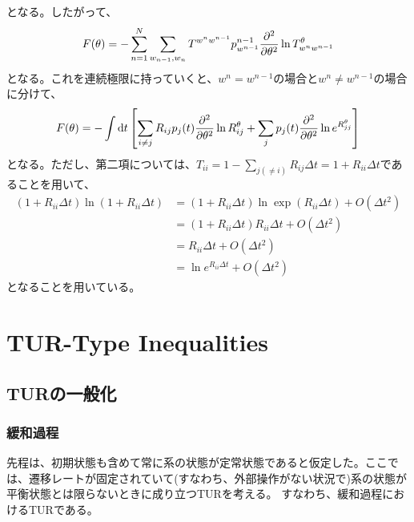 \documentclass[a4paper,11pt]{jsarticle}
\numberwithin{equation}{section}
\begin{document}
となる。したがって、
\begin{align}
    F(\theta) = -\sum_{n=1}^N \sum_{w_{n-1}, w_n} T^{w^n w^{n-1}} p^{n-1}_{w^{n-1}} \pdv[2]{\theta} \ln T^\theta_{w^n w^{n-1}}
\end{align}
となる。これを連続極限に持っていくと、$w^n = w^{n-1}$の場合と$w^n \neq w^{n-1}$の場合に分けて、
\begin{align}
    F(\theta) = -\int \dd{t} \qty[\sum_{i \neq j} R_{ij} p_j(t) \pdv[2]{\theta} \ln R_{ij}^\theta + \sum_j p_j(t) \pdv[2]{\theta} \ln e^{R_{jj}^\theta}]
\end{align}
となる。ただし、第二項については、$T_{ii} = 1-\sum_{j(\neq i)} R_{ij}\Delta t =1 + R_{ii} \Delta t$であることを用いて、
\begin{align}
    (1+R_{ii}\Delta t )\ln (1+R_{ii}\Delta t) &= (1+R_{ii}\Delta t )\ln \exp(R_{ii}\Delta t) + O(\Delta t^2)\\
    &= (1+R_{ii}\Delta t )R_{ii} \Delta t + O(\Delta t^2)\\
    &= R_{ii} \Delta t + O(\Delta t^2)\\
    &= \ln e^{R_{ii}\Delta t} + O(\Delta t^2)
\end{align}
となることを用いている。

\section{TUR-Type Inequalities}
\subsection{TURの一般化}
\subsubsection{緩和過程}
先程は、初期状態も含めて常に系の状態が定常状態であると仮定した。ここでは、遷移レートが固定されていて(すなわち、外部操作がない状況で)系の状態が平衡状態とは限らないときに成り立つTURを考える。
すなわち、緩和過程におけるTURである。\\
\end{document}
